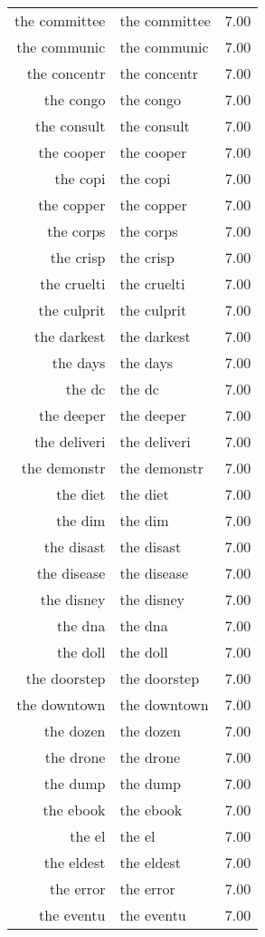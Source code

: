 \begin{table}[ht]
\begin{tabular}{rlr}
  the committee & the committee & 7.00 \\ 
  the communic & the communic & 7.00 \\ 
  the concentr & the concentr & 7.00 \\ 
  the congo & the congo & 7.00 \\ 
  the consult & the consult & 7.00 \\ 
  the cooper & the cooper & 7.00 \\ 
  the copi & the copi & 7.00 \\ 
  the copper & the copper & 7.00 \\ 
  the corps & the corps & 7.00 \\ 
  the crisp & the crisp & 7.00 \\ 
  the cruelti & the cruelti & 7.00 \\ 
  the culprit & the culprit & 7.00 \\ 
  the darkest & the darkest & 7.00 \\ 
  the days & the days & 7.00 \\ 
  the dc & the dc & 7.00 \\ 
  the deeper & the deeper & 7.00 \\ 
  the deliveri & the deliveri & 7.00 \\ 
  the demonstr & the demonstr & 7.00 \\ 
  the diet & the diet & 7.00 \\ 
  the dim & the dim & 7.00 \\ 
  the disast & the disast & 7.00 \\ 
  the disease & the disease & 7.00 \\ 
  the disney & the disney & 7.00 \\ 
  the dna & the dna & 7.00 \\ 
  the doll & the doll & 7.00 \\ 
  the doorstep & the doorstep & 7.00 \\ 
  the downtown & the downtown & 7.00 \\ 
  the dozen & the dozen & 7.00 \\ 
  the drone & the drone & 7.00 \\ 
  the dump & the dump & 7.00 \\ 
  the ebook & the ebook & 7.00 \\ 
  the el & the el & 7.00 \\ 
  the eldest & the eldest & 7.00 \\ 
  the error & the error & 7.00 \\ 
  the eventu & the eventu & 7.00 \\ 

\end{tabular}
\end{table}
